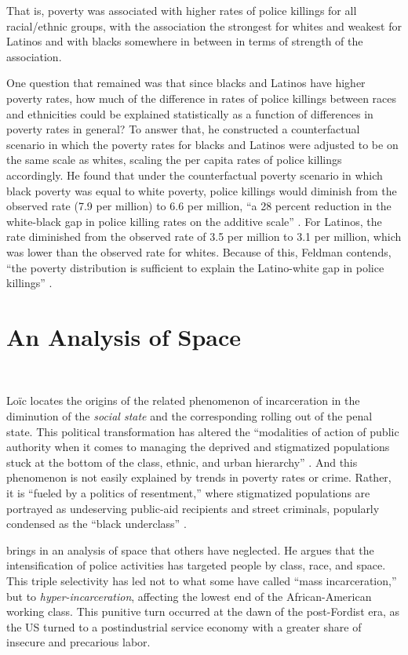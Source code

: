 \documentclass[12pt]{article}
\begin{document}
\noindent{}That is, poverty was associated with higher rates of police killings for all racial/ethnic groups, with the association the strongest for whites and weakest for Latinos and with blacks somewhere in between in terms of strength of the association.

One question that remained was that since blacks and Latinos have higher poverty rates, how much of the difference in rates of police killings between races and ethnicities could be explained statistically as a function of differences in poverty rates in general? To answer that, he constructed a counterfactual scenario in which the poverty rates for blacks and Latinos were adjusted to be on the same scale as whites, scaling the per capita rates of police killings accordingly. He found that under the counterfactual poverty scenario in which black poverty was equal to white poverty, police killings would diminish from the observed rate (7.9 per million) to 6.6 per million, “a 28 percent reduction in the white-black gap in police killing rates on the additive scale” \parencite{feldmanPoliceKillingsUS2020}. For Latinos, the rate diminished from the observed rate of 3.5 per million to 3.1 per million, which was lower than the observed rate for whites. Because of this, Feldman contends, “the poverty distribution is sufficient to explain the Latino-white gap in police killings” \parencite{feldmanPoliceKillingsUS2020}.

\section{An Analysis of Space}\

Lo\"ic \textcite{wacquantClassRaceHyperincarceration2010} locates the origins of the related phenomenon of incarceration in the diminution of the \textit{social state} and the corresponding rolling out of the penal state. This political transformation has altered the “modalities of action of public authority when it comes to managing the deprived and stigmatized populations stuck at the bottom of the class, ethnic, and urban hierarchy” \parencite[74]{wacquantClassRaceHyperincarceration2010}. And this phenomenon is not easily explained by trends in poverty rates or crime. Rather, it is “fueled by a politics of resentment,” where stigmatized populations are portrayed as undeserving public-aid recipients and street criminals, popularly condensed as the “black underclass” \parencite[74]{wacquantClassRaceHyperincarceration2010}.

\textcite{wacquantClassRaceHyperincarceration2010} brings in an analysis of space that others have neglected. He argues that the intensification of police activities has targeted people by class, race, and space. This triple selectivity has led not to what some have called “mass incarceration,” but to \emph{hyper-incarceration}, affecting the lowest end of the African-American working class. This punitive turn occurred at the dawn of the post-Fordist era, as the US turned to a postindustrial service economy with a greater share of insecure and precarious labor.
\end{document}
